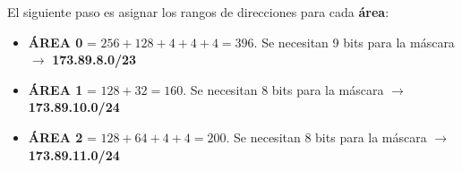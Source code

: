 \par El siguiente paso es asignar los rangos de direcciones para cada \textbf{área}:
\begin{itemize}
	\item{\textbf{ÁREA 0}} = $256 + 128 + 4 + 4 + 4 = 396$. Se necesitan 9 bits para la máscara $\rightarrow$ \textbf{173.89.8.0/23}
	\item{\textbf{ÁREA 1}} = $128 + 32 = 160$. Se necesitan 8 bits para la máscara $\rightarrow$ \textbf{173.89.10.0/24}
	\item{\textbf{ÁREA 2}} = $128 + 64 + 4 + 4 = 200$. Se necesitan 8 bits para la máscara $\rightarrow$ \textbf{173.89.11.0/24}
\end{itemize}


